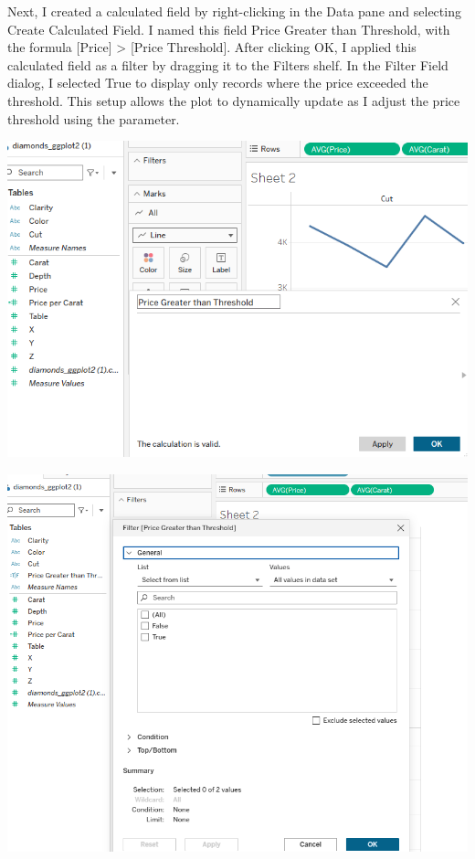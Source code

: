 \documentclass[
  letterpaper,
  DIV=11,
  numbers=noendperiod]{scrreprt}
\begin{document}
Next, I created a calculated field by right-clicking in the Data pane
and selecting Create Calculated Field. I named this field Price Greater
than Threshold, with the formula {[}Price{]} \textgreater{} {[}Price
Threshold{]}. After clicking OK, I applied this calculated field as a
filter by dragging it to the Filters shelf. In the Filter Field dialog,
I selected True to display only records where the price exceeded the
threshold. This setup allows the plot to dynamically update as I adjust
the price threshold using the parameter.

\includegraphics{Step1_Creating_Calculated_Field_Olufawo.png}

\includegraphics{Filters_Shelf_Olufawo.png}
\end{document}
